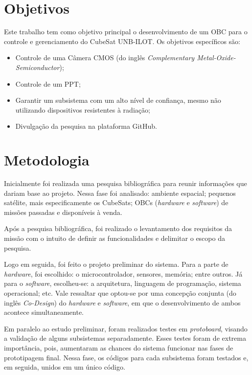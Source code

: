 \section{Objetivos}

Este trabalho tem como objetivo principal o desenvolvimento de um OBC para o controle e gerenciamento do CubeSat UNB-ILOT.  Os objetivos específicos são:

\begin{itemize}
	
	\item Controle de uma Câmera CMOS (do inglês \textit{Complementary Metal-Oxide-Semiconductor});
	\item Controle de um PPT;
	\item Garantir um subsistema com um alto nível de confiança, mesmo não utilizando dispositivos resistentes à radiação;
	\item Divulgação da pesquisa na plataforma GitHub.
	
\end{itemize}


\section{Metodologia}
\label{metodo}
Inicialmente foi realizada uma pesquisa bibliográfica para reunir informações que dariam base ao projeto. Nessa fase foi analisado: ambiente espacial; pequenos satélite, mais especificamente os CubeSats; OBCs (\textit{hardware} e \textit{software}) de missões passadas e disponíveis à venda.

Após a pesquisa bibliográfica, foi realizado o levantamento dos requisitos da missão com o intuito de definir as funcionalidades e delimitar o escopo da pesquisa.

Logo em seguida, foi feito o projeto preliminar do sistema. Para a parte de \textit{hardware}, foi escolhido: o microcontrolador, sensores, memória; entre outros. Já para o \textit{software}, escolheu-se: a arquitetura, linguagem de programação, sistema operacional; etc. Vale ressaltar que optou-se por uma concepção conjunta (do inglês \textit{Co-Design}) do \textit{hardware} e \textit{software}, em que o desenvolvimento de ambos acontece simultaneamente.

Em paralelo ao estudo preliminar, foram realizados testes em \textit{protoboard}, visando a validação de alguns subsistemas separadamente. Esses testes foram de extrema importância, pois, aumentaram as chances do sistema funcionar nas fases de prototipagem final. Nessa fase, os códigos para cada subsistema foram testados e, em seguida, unidos em um único código.

